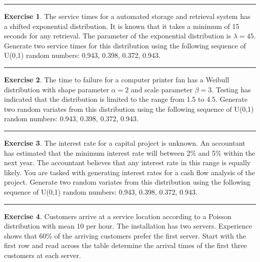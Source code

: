 \documentclass[
]{book}
\theoremstyle{definition}
\theoremstyle{definition}
\theoremstyle{definition}
\newtheorem{exercise}{Exercise}[chapter]
\theoremstyle{definition}
\theoremstyle{remark}
\begin{document}
\begin{center}\rule{0.5\linewidth}{0.5pt}\end{center}

\begin{exercise}
\protect\hypertarget{exr:AppRNRVP13}{}{\label{exr:AppRNRVP13} }The service times for a automated storage and retrieval system has a shifted
exponential distribution. It is known that it takes a minimum of 15
seconds for any retrieval. The parameter of the exponential distribution
is \(\lambda = 45\). Generate two service times for this distribution using the following sequence of U(0,1) random numbers: 0.943, 0.398, 0.372, 0.943.
\end{exercise}

\begin{center}\rule{0.5\linewidth}{0.5pt}\end{center}

\begin{exercise}
\protect\hypertarget{exr:AppRNRVP14}{}{\label{exr:AppRNRVP14} }The time to failure for a computer
printer fan has a Weibull distribution with shape parameter \(\alpha = 2\)
and scale parameter \(\beta = 3\). Testing has indicated that the
distribution is limited to the range from 1.5 to 4.5. Generate two random variates from this distribution using the following sequence of U(0,1) random numbers: 0.943, 0.398, 0.372, 0.943.
\end{exercise}

\begin{center}\rule{0.5\linewidth}{0.5pt}\end{center}

\begin{exercise}
\protect\hypertarget{exr:AppRNRVP15}{}{\label{exr:AppRNRVP15} }The interest rate for a capital project is unknown. An accountant has
estimated that the minimum interest rate will between 2\% and 5\% within
the next year. The accountant believes that any interest rate in this
range is equally likely. You are tasked with generating interest rates
for a cash flow analysis of the project. Generate two random variates from this distribution using the following sequence of U(0,1) random numbers: 0.943, 0.398, 0.372, 0.943.
\end{exercise}

\begin{center}\rule{0.5\linewidth}{0.5pt}\end{center}

\begin{exercise}
\protect\hypertarget{exr:AppRNRVP16}{}{\label{exr:AppRNRVP16} }Customers arrive at a service location according to a Poisson distribution with mean 10 per
hour. The installation has two servers. Experience shows that 60\% of the
arriving customers prefer the first server. Start with the first row and read across the table determine the arrival times of the first three customers at each server.
\end{exercise}
\end{document}

